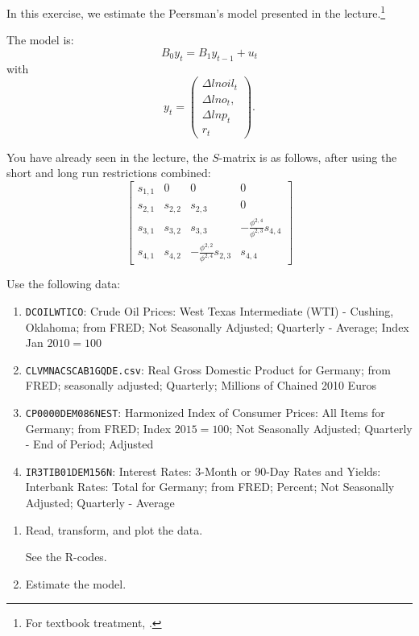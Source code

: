 In this exercise, we estimate the Peersman's model presented in the lecture.\footnote{For textbook treatment, \cite[][see page 535]{MartinHurnHarris-2012}.}

The model is:
\[ B_0 y_t = B_1 y_{t-1} + u_t \]
with
\[
    y_t = \begin{pmatrix}
        \Delta ln oil_t \\ \Delta ln o_t, \\ \Delta ln p_t \\ r_t
    \end{pmatrix}.
\]

You have already seen in the lecture, the $S$-matrix is as follows, after using the short and long run restrictions combined:
\[
    \begin{bmatrix}
        s_{1, 1}
         & 0
         & 0
         & 0
        \\
        s_{2, 1}
         & s_{2, 2}
         & s_{2, 3}
         & 0
        \\
        s_{3, 1}
         & s_{3, 2}
         & s_{3, 3}
         & -\frac{\phi^{2, 4}}{\phi^{2, 3}} s_{4, 4}
        \\
        s_{4, 1}
         & s_{4, 2}
         & -\frac{\phi^{2, 2}}{\phi^{2, 4}} s_{2, 3}
         & s_{4, 4}
    \end{bmatrix}
\]

Use the following data:
\begin{enumerate}[label=--]
    \item \verb|DCOILWTICO|: Crude Oil Prices: West Texas Intermediate (WTI) - Cushing, Oklahoma; from FRED; Not Seasonally Adjusted; Quarterly - Average; Index Jan $2010=100$

    \item \verb|CLVMNACSCAB1GQDE.csv|: Real Gross Domestic Product for Germany; from FRED; seasonally adjusted; Quarterly; Millions of Chained 2010 Euros

    \item \verb|CP0000DEM086NEST|: Harmonized Index of Consumer Prices: All Items for Germany; from FRED; Index $2015=100$; Not Seasonally Adjusted; Quarterly - End of Period; Adjusted

    \item \verb|IR3TIB01DEM156N|: Interest Rates: 3-Month or 90-Day Rates and Yields: Interbank Rates: Total for Germany; from FRED; Percent; Not Seasonally Adjusted; Quarterly - Average
\end{enumerate}


\begin{enumerate}
    \item Read, transform, and plot the data.

          \begin{sol}
              See the R-codes.
          \end{sol}

    \item Estimate the model.

          \begin{sol}
              
          \end{sol}
\end{enumerate}